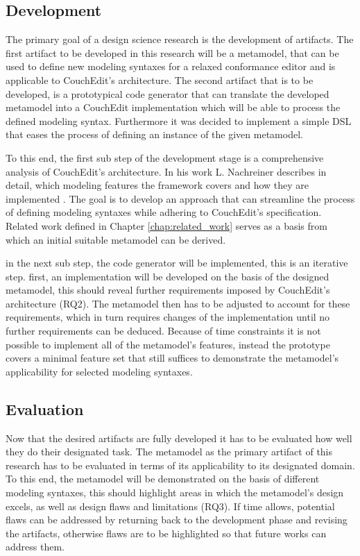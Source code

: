 \subsection{Development}
The primary goal of a design science research is the development of artifacts.
The first artifact to be developed in this research will be a metamodel, that can be used to define new modeling syntaxes for a relaxed conformance editor and is applicable to CouchEdit's architecture. The second artifact that is to be developed, is a prototypical code generator that can translate the developed metamodel into a CouchEdit implementation which will be able to process the defined modeling syntax. Furthermore it was decided to implement a simple DSL that eases the process of defining an instance of the given metamodel.

To this end, the first sub step of the development stage is a comprehensive analysis of CouchEdit's architecture. In his work L. Nachreiner describes in detail, which modeling features the framework covers and how they are implemented \cite{nachreiner_couchedit_2020}. The goal is to develop an approach that can streamline the process of defining modeling syntaxes while adhering to CouchEdit's specification. Related work defined in Chapter \ref{chap:related_work} serves as a basis from which an initial suitable metamodel can be derived.

in the next sub step, the code generator will be implemented, this is an iterative step. first, an implementation will be developed on the basis of the designed metamodel, this should reveal further requirements imposed by CouchEdit's architecture (RQ2). The metamodel then has to be adjusted to account for these requirements, which in turn requires changes of the implementation until no further requirements can be deduced. Because of time constraints it is not possible to implement all of the metamodel's features, instead the prototype covers a minimal feature set that still suffices to demonstrate the metamodel's applicability for selected modeling syntaxes.

\subsection{Evaluation}
Now that the desired artifacts are fully developed it has to be evaluated how well they do their designated task. The metamodel as the primary artifact of this research has to be evaluated in terms of its applicability to its designated domain. To this end, the metamodel will be demonstrated on the basis of different modeling syntaxes, this should highlight areas in which the metamodel's design excels, as well as design flaws and limitations (RQ3). If time allows, potential flaws can be addressed by returning back to the development phase and revising the artifacts, otherwise flaws are to be highlighted so that future works can address them.


